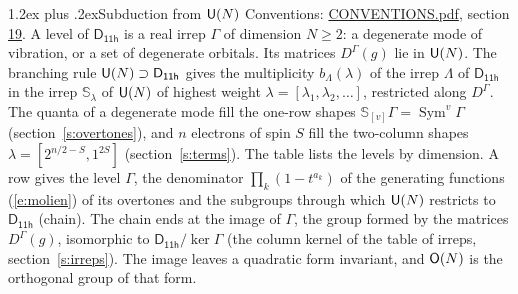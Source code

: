\documentclass[10pt,a4paper]{article}
\makeatletter
\renewcommand\section{\@startsection{section}{1}{\z@}{-3ex plus -1ex minus -.2ex}%
  {1.2ex plus .2ex}{\normalfont\large\sffamily\bfseries\color{parttitle}}}
\numberwithin{equation}{section}
\newcommand{\grp}[1]{\mathsf{#1}}
\newcommand{\repD}[1]{D^{#1}}
\newcommand{\schur}[1]{\mathbb{S}_{#1}}
\newcommand{\shape}[1]{[#1]}
\makeatother
\begin{document}
\section{Subduction from \texorpdfstring{$\grp{U(\mathnormal{N})}$}{U(N)}}\label{s:unitary}
Conventions: \href{../../CONVENTIONS.pdf}{CONVENTIONS.pdf}, section \href{../../CONVENTIONS.pdf\#conv.19}{19}.
\leavevmode\label{n:local.level.dimension}A level of $\grp{D_{11h}}$ is a real irrep $\Gamma$ of dimension $N \ge 2$: a degenerate mode of vibration, or a set of degenerate orbitals. \label{n:group.unitary}Its matrices $\repD{\Gamma}(g)$ lie in $\grp{U(\mathnormal{N})}$. \label{n:irrep.schur}\label{n:shape.partition}\label{n:local.partition}\label{n:function.multiplicity.unitary}The branching rule $\grp{U(\mathnormal{N})} \supset \grp{D_{11h}}$ gives the multiplicity $b_\Lambda(\lambda)$ of the irrep $\Lambda$ of $\grp{D_{11h}}$ in the irrep $\schur{\lambda}$ of $\grp{U(\mathnormal{N})}$ of highest weight $\lambda = \shape{\lambda_1, \lambda_2, \dots}$, restricted along $\repD{\Gamma}$. \label{n:local.partition.power}\label{n:local.electrons}\label{n:local.spin}The quanta of a degenerate mode fill the one-row shapes $\schur{\shape{v}}\Gamma = \operatorname{Sym}^{v}\Gamma$ (section~\ref{s:overtones}), and $n$ electrons of spin $S$ fill the two-column shapes $\lambda = \shape{2^{n/2-S}, 1^{2S}}$ (section~\ref{s:terms}).
The table lists the levels by dimension. \label{n:head.level}\label{n:head.denominator}\label{n:index.overtone.denominator}\label{n:head.chain}A row gives the level $\Gamma$, the denominator $\prod_k (1 - t^{a_k})$ of the generating functions (\ref{e:molien}) of its overtones and the subgroups through which $\grp{U(\mathnormal{N})}$ restricts to $\grp{D_{11h}}$ (chain). The chain ends at the image of $\Gamma$, the group formed by the matrices $\repD{\Gamma}(g)$, isomorphic to $\grp{D_{11h}}/\ker\Gamma$ (the column kernel of the table of irreps, section~\ref{s:irreps}). The image leaves a quadratic form invariant, and $\grp{O(\mathnormal{N})}$ is the orthogonal group of that form.
\end{document}
